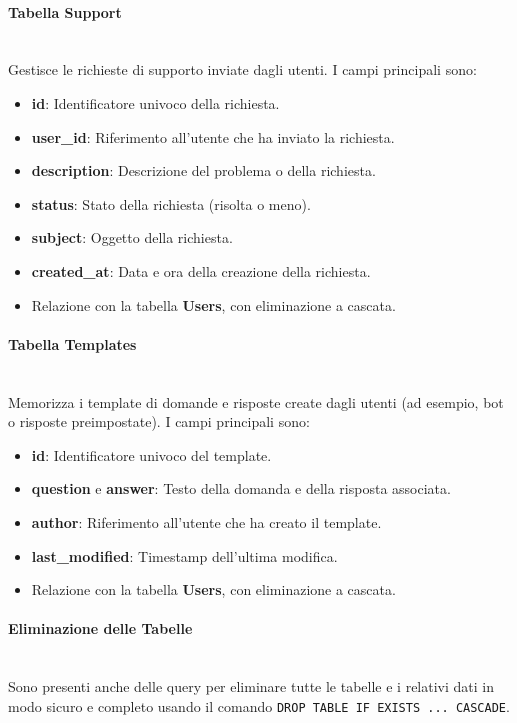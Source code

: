     \paragraph{Tabella Support} \mbox{} \\
    Gestisce le richieste di supporto inviate dagli utenti. I campi principali sono:
    \begin{itemize}
        \item \textbf{id}: Identificatore univoco della richiesta.
        \item \textbf{user\_id}: Riferimento all’utente che ha inviato la richiesta.
        \item \textbf{description}: Descrizione del problema o della richiesta.
        \item \textbf{status}: Stato della richiesta (risolta o meno).
        \item \textbf{subject}: Oggetto della richiesta.
        \item \textbf{created\_at}: Data e ora della creazione della richiesta.
        \item Relazione con la tabella \textbf{Users}, con eliminazione a cascata.
    \end{itemize}
    
    \paragraph{Tabella Templates} \mbox{} \\
    Memorizza i template di domande e risposte create dagli utenti (ad esempio, bot o risposte preimpostate). I campi principali sono:
    \begin{itemize}
        \item \textbf{id}: Identificatore univoco del template.
        \item \textbf{question} e \textbf{answer}: Testo della domanda e della risposta associata.
        \item \textbf{author}: Riferimento all’utente che ha creato il template.
        \item \textbf{last\_modified}: Timestamp dell’ultima modifica.
        \item Relazione con la tabella \textbf{Users}, con eliminazione a cascata.
    \end{itemize}
    
    \paragraph{Eliminazione delle Tabelle} \mbox{} \\
    Sono presenti anche delle query per eliminare tutte le tabelle e i relativi dati in modo sicuro e completo usando il comando \texttt{DROP TABLE IF EXISTS ... CASCADE}.
    
